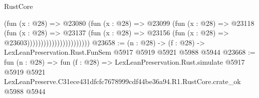 \begin{lexlean}{RustCore}
\begin{coremodule}
                                      (fun (x : @28) =>
                                      @23080
                                        (fun (x : @28) =>
                                        @23099
                                          (fun (x : @28) =>
                                          @23118
                                            (fun (x : @28) =>
                                            @23137
                                              (fun (x : @28) =>
                                              @23156 (fun (x : @28) => @23603)))))))))))))))))))))))
@23658 := (n : @28) -> (f : @28) -> LexLeanPreservation.Rust.FunSem @5917 @5919 @5921 @5988 @5944
@23668 := fun (n : @28) =>
  fun (f : @28) =>
  LexLeanPreservation.Rust.simulate
    @5917
    @5919
    @5921
    LexLeanPreserve.C31ece431dfcfc7678999cdf44be36a94.R1.RustCore.crate_ok
    @5988
    @5944
\end{coremodule}
\end{lexlean}
